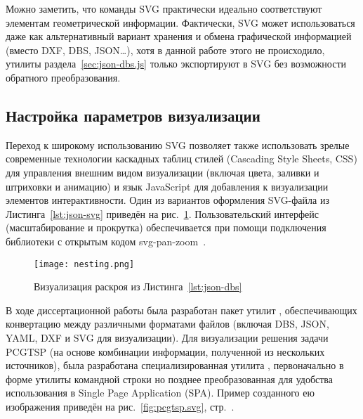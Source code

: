 Можно заметить,
что команды SVG
практически идеально соответствуют
элементам геометрической информации.
Фактически,
SVG может использоваться даже
как альтернативный вариант
хранения и обмена графической информацией
(вместо DXF, DBS, JSON\dots),
хотя в данной работе этого не происходило,
утилиты раздела~\ref{sec:json-dbs.js}
только экспортируют в SVG
без возможности обратного преобразования.

\subsection{Настройка параметров визуализации}

Переход к широкому использованию SVG
позволяет также использовать зрелые современные технологии
каскадных таблиц стилей
(Cascading Style Sheets, CSS)
для управления внешним видом визуализации
(включая цвета, заливки и штриховки и анимацию)
и язык JavaScript
для добавления к визуализации
элементов интерактивности.
Один из вариантов оформления
SVG-файла из Листинга~\ref{lst:json-svg}
приведён на рис.~\ref{fig:json-nesting}.
Пользовательский интерфейс
(масштабирование и прокрутка)
обеспечивается при помощи подключения
библиотеки с открытым кодом
svg-pan-zoom~\cite{bi:svg-pan-zoom}.

\begin{figure}
  \centering
  \texttt{[image: nesting.png]}
  \caption{Визуализация раскроя из Листинга~\ref{lst:json-dbs}}
  \label{fig:json-nesting}
\end{figure}

В ходе диссертационной работы
была разработан пакет утилит
\cite{bi:dbs2json},
обеспечивающих конвертацию между
различными форматами файлов
(включая DBS, JSON, YAML, DXF и SVG для визуализации).
Для визуализации решения задачи PCGTSP
(на основе комбинации информации,
полученной из нескольких источников),
была разработана специализированная утилита
\cite{bi:j2pcgtsp},
первоначально в форме утилиты командной строки
но позднее преобразованная
для удобства использования в
Single Page Application
(SPA).
Пример созданного ею изображения
приведён на рис.~\ref{fig:pcgtsp.svg},
стр.~\pageref{fig:pcgtsp.svg}.
